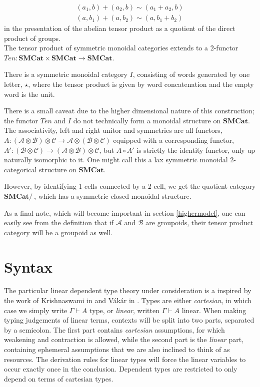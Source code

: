 \[
  \begin{split}
    (a_1,b)+(a_2,b) \sim (a_1+a_2,b) \\
    (a,b_1)+(a,b_2) \sim (a,b_1+b_2)
  \end{split}
\]
in the presentation of the abelian tensor product as a quotient of the direct product of groups.\\
The tensor product of symmetric monoidal categories extends to a 2-functor $Ten : \mathbf{SMCat} \times \mathbf{SMCat} \to \mathbf{SMCat}$.
\begin{defn}
  There is a symmetric monoidal category $I$, consisting of words generated by one letter, $\star$, where the tensor product is given by word concatenation and the empty word is the unit.
\end{defn}
There is a small caveat due to the higher dimensional nature of this construction; the functor $Ten$ and $I$ do not technically form a monoidal structure on $\mathbf{SMCat}$. The associativity, left and right unitor and symmetries are all functors, $A : (\mathcal{A} \otimes \mathcal{B}) \otimes \mathcal{C} \to \mathcal{A} \otimes (\mathcal{B} \otimes \mathcal{C})$ equipped with a corresponding functor, $A' : (\mathcal{B} \otimes \mathcal{C}) \to (\mathcal{A} \otimes \mathcal{B}) \otimes \mathcal{C}$, but $A \circ A'$ is strictly the identity functor, only up naturally isomorphic to it. One might call this a lax symmetric monoidal 2-categorical structure on $\mathbf{SMCat}$.

However, by identifying 1-cells connected by a 2-cell, we get the quotient category $\mathbf{SMCat}/~$, which has a symmetric closed monoidal structure.

As a final note, which will become important in section \ref{highermodel}, one can easily see from the definition that if $\mathcal{A}$ and $\mathcal{B}$ are groupoids, their tensor product category will be a groupoid as well.
%
\section{Syntax}\label{syntax}
The particular linear dependent type theory under consideration is a inspired by the work of Krishnaswami in \cite{krishnaswami} and Vákár in \cite{vakar14}. Types are either \textit{cartesian}, in which case we simply write $\Gamma \vdash A \text{ type}$, or \textit{linear}, written $\Gamma \vdash A \text{ linear}$. When making typing judgements of linear terms, contexts will be split into two parts, separated by a semicolon. The first part contains \textit{cartesian} assumptions, for which weakening and contraction is allowed, while the second part is the \textit{linear} part, containing ephemeral assumptions that we are also inclined to think of as resources. The derivation rules for linear types will force the linear variables to occur exactly once in the conclusion. Dependent types are restricted to only depend on terms of cartesian types. 
